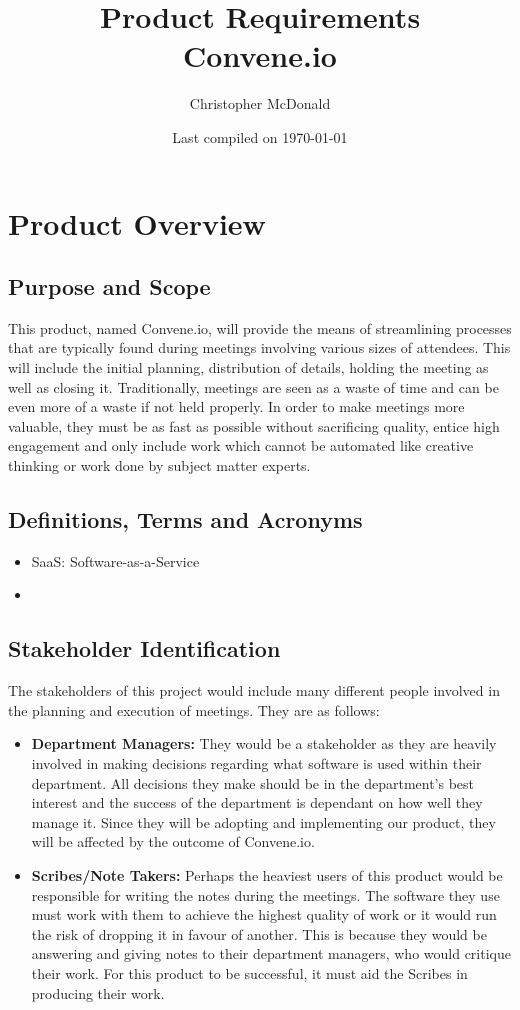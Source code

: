 \documentclass[11pt, oneside]{article}
\title{ Product Requirements \\ Convene.io}
\author{Christopher McDonald}
\date{Last compiled on \today}
\begin{document}
\maketitle
\tableofcontents
\section{Product Overview}
\subsection{Purpose and Scope}
This product, named Convene.io, will provide the means of streamlining processes that are typically found during meetings involving various sizes of attendees. This will include the initial planning, distribution of details, holding the meeting as well as closing it. Traditionally, meetings are seen as a waste of time and can be even more of a waste if not held properly. In order to make meetings more valuable, they must be as fast as possible without sacrificing quality, entice high engagement and only include work which cannot be automated like creative thinking or work done by subject matter experts. \\
\subsection{Definitions, Terms and Acronyms}
\begin{itemize}
\item SaaS: Software-as-a-Service
\item 
\end{itemize}
\subsection{Stakeholder Identification}
The stakeholders of this project would include many different people involved in the planning and execution of meetings. They are as follows: \\
\begin{itemize}
	\item \textbf{Department Managers:} They would be a stakeholder as they are heavily involved in making decisions regarding what software is used within their department. All decisions they make should be in the department's best interest and the success of the department is dependant on how well they manage it. Since they will be adopting and implementing our product, they will be affected by the outcome of Convene.io.  
	\item \textbf{Scribes/Note Takers:} Perhaps the heaviest users of this product would be responsible for writing the notes during the meetings. The software they use must work with them to achieve the highest quality of work or it would run the risk of dropping it in favour of another. This is because they would be answering and giving notes to their department managers, who would critique their work. For this product to be successful, it must aid the Scribes in producing their work. 
\end{itemize}
\end{document}
